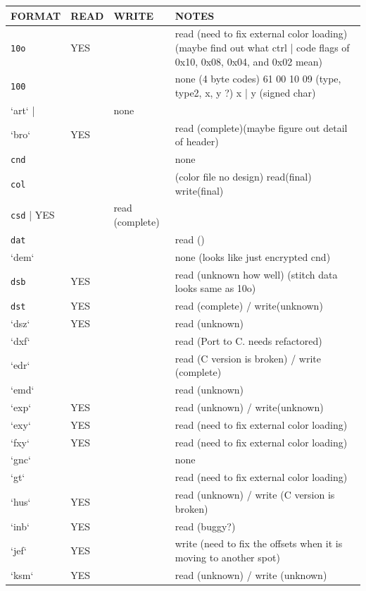 \documentclass{report}
\begin{document}
\begin{longtable}{l l l p{8cm}}
\textbf{FORMAT} & \textbf{READ} & \textbf{WRITE} & \textbf{NOTES} \\
\hline
\index{.10o}\texttt{10o} & YES &  & read (need to fix external color loading) (maybe find out what ctrl | code flags of 0x10, 0x08, 0x04, and 0x02 mean) \\
\index{.100}\texttt{100} &  &  & none (4 byte codes) 61 00 10 09 (type, type2, x, y ?) x | y (signed char) \\
\index{.art}`art` |  &  & none \\
\index{.bro}`bro` & YES &  & read (complete)(maybe figure out detail of header) \\
\index{.cnd}\texttt{cnd} &  &  & none \\
\index{.col}\texttt{col} &  &  & (color file no design) read(final) write(final) \\
\index{.csd}\texttt{csd} | YES   &  & read (complete) \\
\index{.dat}\texttt{dat} &  &  & read () \\
\index{.dem}`dem` &  &  & none (looks like just encrypted cnd) \\
\index{.dsb}\texttt{dsb} & YES   &  & read (unknown how well) (stitch data looks same as 10o) \\
\index{.dst}\texttt{dst} & YES   &  & read (complete) / write(unknown) \\
`dsz` & YES   &  & read (unknown) \\
`dxf` &  &  & read (Port to C. needs refactored) \\
`edr` &  &  & read (C version is broken) / write (complete) \\
`emd` &  &  & read (unknown) \\
`exp` & YES   &  & read (unknown) / write(unknown) \\
`exy` & YES   &  & read (need to fix external color loading) \\
`fxy` & YES   &  & read (need to fix external color loading) \\
`gnc` &  &  & none \\
`gt` &  &  & read (need to fix external color loading) \\
`hus` & YES   &  & read (unknown) / write (C version is broken) \\
`inb` & YES   &  & read (buggy?) \\
`jef` & YES   &  & write (need to fix the offsets when it is moving to another spot) \\
`ksm` & YES   &  & read (unknown) / write (unknown) \\

\end{longtable}
\end{document}
